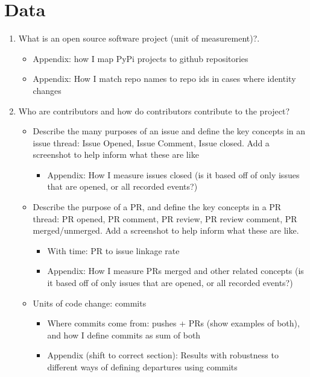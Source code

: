 \documentclass[12pt,notitlepage]{article}
\begin{document}
\section{Data} \label{sec:data}
\begin{enumerate}
    \item What is an open source software project (unit of measurement)?. 
    \begin{itemize}
        \item Appendix: how I map PyPi projects to github repositories
        \item Appendix: How I match repo names to repo ids in cases where identity changes
    \end{itemize}
    \item Who are contributors and how do contributors contribute to the project?
    \begin{itemize}
        \item Describe the many purposes of an issue and define the key concepts in an issue thread: Issue Opened, Issue Comment, Issue closed. Add a screenshot to help inform what these are like
        \begin{itemize}
            \item Appendix: How I measure issues closed (is it based off of only issues that are opened, or all recorded events?)
        \end{itemize}
        \item Describe the purpose of a PR, and define the key concepts in a PR thread: PR opened, PR comment, PR review, PR review comment, PR merged/unmerged. Add a screenshot to help inform what these are like. 
        \begin{itemize}
            \item With time: PR to issue linkage rate
            \item Appendix: How I measure PRs merged and other related concepts (is it based off of only issues that are opened, or all recorded events?)
        \end{itemize}
        \item Units of code change: commits
        \begin{itemize}
            \item Where commits come from: pushes + PRs (show examples of both), and how I define commits as sum of both
            \item Appendix (shift to correct section): Results with robustness to different ways of defining departures using commits

\end{itemize}
\end{itemize}
\end{enumerate}
\end{document}
